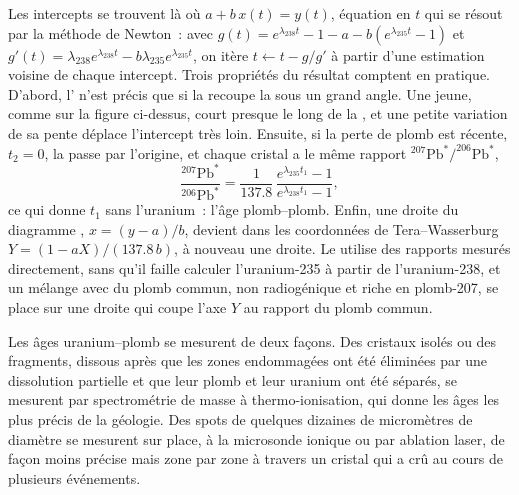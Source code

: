 
Les intercepts se trouvent là où $a + b\,x(t) = y(t)$, équation en $t$ qui se résout
par la méthode de Newton~: avec $g(t) = e^{\lambda_{238}t} - 1 - a -
b(e^{\lambda_{235}t} - 1)$ et $g'(t) = \lambda_{238}e^{\lambda_{238}t} -
b\lambda_{235}e^{\lambda_{235}t}$, on itère $t \leftarrow t - g/g'$ à partir d'une estimation
voisine de chaque intercept. Trois propriétés du résultat comptent en pratique.
D'abord, l' n'est précis que si la  recoupe la
 sous un grand angle. Une  jeune, comme sur la figure ci-dessus, court
presque le long de la , et une petite variation de sa pente déplace
l'intercept très loin. Ensuite, si la perte de plomb est récente, $t_2 = 0$, la
 passe par l'origine, et chaque cristal a le même
rapport $^{207}\mathrm{Pb}^*/^{206}\mathrm{Pb}^*$,
\[
\frac{^{207}\mathrm{Pb}^*}{^{206}\mathrm{Pb}^*} = \frac{1}{137.8}\,
\frac{e^{\lambda_{235}t_1} - 1}{e^{\lambda_{238}t_1} - 1},
\]
ce qui donne $t_1$ sans l'uranium~: l'âge plomb--plomb. Enfin, une droite du
diagramme , $x = (y - a)/b$, devient dans les
coordonnées de Tera--Wasserburg $Y = (1 - aX)/(137.8\,b)$, à nouveau une droite. Le
 utilise des rapports mesurés directement, sans qu'il faille calculer
l'uranium-235 à partir de l'uranium-238, et un mélange avec du plomb commun, non radiogénique et riche en
plomb-207, se place sur une droite qui coupe l'axe $Y$ au rapport du plomb
commun.

Les âges uranium--plomb se mesurent de deux façons. Des cristaux isolés ou des
fragments, dissous après que les zones endommagées ont été éliminées par une
dissolution partielle et que leur plomb et leur uranium ont été séparés, se mesurent par
spectrométrie de masse à thermo-ionisation, qui donne les âges les plus précis de la géologie. Des spots de quelques dizaines de
micromètres de diamètre se mesurent sur place, à la microsonde ionique ou par
ablation laser, de façon moins précise mais zone par zone à travers un cristal qui a
crû au cours de plusieurs événements.

